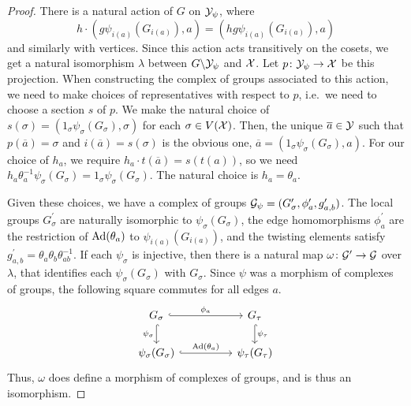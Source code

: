 \begin{proof}
	There is a natural action of $G$ on  $\mathcal{Y}_\psi$, where
	\[
		h \cdot (g\psi_{i(a)}(G_{i(a)}), a) = (hg\psi_{i(a)}(G_{i(a)}), a)
	\]
	and similarly with vertices.
	Since this action acts transitively on the cosets, we get a natural isomorphism $\lambda$ between $G \backslash \mathcal{Y}_\psi$ and  $\mathcal{X}$.
	Let $p \colon \mathcal{Y}_\psi \to \mathcal{X}$ be this projection.
	When constructing the complex of groups associated to this action, we need to make choices of representatives with respect to $p$, i.e.~we need to choose a section $s$ of $p$.
	We make the natural choice of $s(\sigma) = (1_\sigma \psi_\sigma(G_\sigma), \sigma)$ for each $\sigma \in V(\mathcal{X})$.
	Then, the unique $\overline{a} \in \mathcal{Y}$ such that $p(\overline{a}) = \sigma$ and $i(\overline{a}) = s(\sigma)$ is the obvious one, $\overline{a} = (1_\sigma\psi_\sigma(G_\sigma), a)$.
	For our choice of $h_a$, we require  $h_a \cdot t(\overline{a}) = s(t(a))$, so we need $h_a\theta_a^{-1}\psi_\sigma(G_\sigma) = 1_\sigma \psi_\sigma(G_\sigma)$.
	The natural choice is $h_a = \theta_a$.

	Given these choices, we have a complex of groups $\mathcal{G}_\psi = (G^\prime_\sigma, \phi^\prime_a, g^\prime_{a,b})$.
	The local groups $G^\prime_\sigma$ are naturally isomorphic to $\psi_\sigma(G_\sigma)$, the edge homomorphisms  $\phi^\prime_a$ are the restriction of $\operatorname{Ad}(\theta_a)$ to $\psi_{i(a)}(G_{i(a)})$, and the twisting elements satisfy $g^\prime_{a,b} = \theta_a\theta_b\theta_{ab}^{-1}$.
	If each $\psi_\sigma$ is injective, then there is a natural map $\omega \colon \mathcal{G}^\prime \to \mathcal{G}$ over $\lambda$, that identifies each $\psi_\sigma(G_\sigma)$ with $G_\sigma$.
	Since  $\psi$ was a morphism of complexes of groups, the following square commutes for all edges $a$.
	\[
		\begin{tikzcd}
			G_\sigma \ar[d, hook, "\psi_\sigma"'] \ar[rr, hook, "\phi_a"] && G_\tau \ar[d, hook, "\psi_\tau"] \\
			\psi_\sigma(G_\sigma) \ar[rr, hook, "\ad(\theta_a)"] && \psi_\tau(G_\tau)
		\end{tikzcd}
	\]
	Thus, $\omega$ does define a morphism of complexes of groups, and is thus an isomorphism.
\end{proof}

